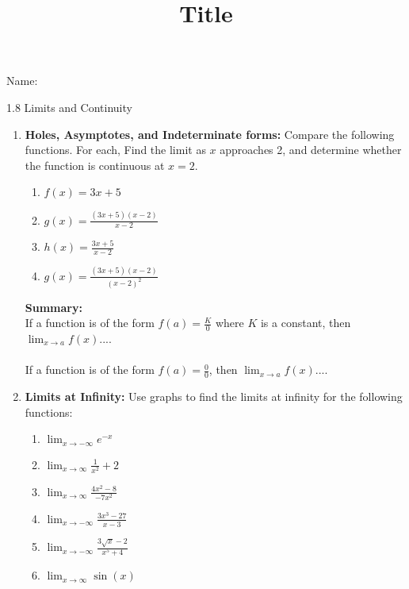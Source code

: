 \documentclass[12pt]{article}
\title{Title}
\begin{document}
 Name:
 \begin{center}\large{1.8 Limits and Continuity}\end{center}

\begin{enumerate}


\item  \textbf{Holes, Asymptotes, and Indeterminate forms:} Compare the following functions. For each, Find the limit as $x$ approaches 2, and determine whether the function is continuous at $x=2$.
	\begin{multicols}{2}
	\begin{enumerate}[itemsep=1cm]
	\item $\displaystyle f(x)=3x+5$
	\item $\displaystyle g(x)=\frac{(3x+5)(x-2)}{x-2}$
	\item $\displaystyle h(x)=\frac{3x+5}{x-2}$
	\item $\displaystyle g(x)=\frac{(3x+5)(x-2)}{(x-2)^2}$
	\end{enumerate}
	\end{multicols}
\vfill
\begin{tcolorbox}
\textbf{Summary:}\\
If a function is of the form $\displaystyle f(a)=\frac{K}{0}$ where $K$ is a constant, then $\displaystyle \lim_{x\to a} f(x) $....\\
\vspace{10mm}\\
If a function is of the form $\displaystyle f(a)=\frac{0}{0}$, then $\displaystyle \lim_{x\to a} f(x) $....\\
\vspace{10mm}
\end{tcolorbox}


\item \textbf{Limits at Infinity:} 
Use graphs to find the limits at infinity for the following functions:
	\begin{multicols}{2}
	\begin{enumerate}[itemsep=1cm]
	\item $\displaystyle \lim_{x\to -\infty} e^{-x}$
	\item $\displaystyle \lim_{x\to \infty}\frac{1}{x^2}+2$
	\item $\displaystyle \lim_{x\to \infty}\frac{4x^2-8}{-7x^2}$
	\item $\displaystyle \lim_{x\to -\infty}\frac{3x^3-27}{x-3}$
	\item $\displaystyle \lim_{x\to -\infty}\frac{3\sqrt{x}-2}{x^5+4}$
	\item $\displaystyle \lim_{x\to \infty}\sin(x)$
	

\end{enumerate}
\end{multicols}
\end{enumerate}
\end{document}
